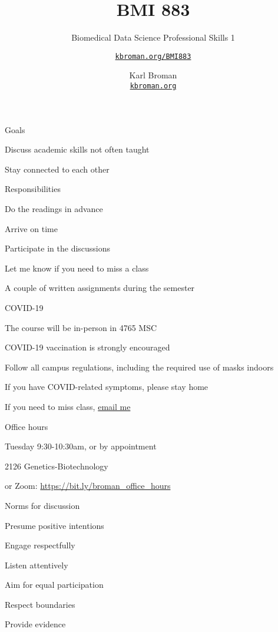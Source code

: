 \documentclass[aspectratio=169,12pt,t]{beamer}
\title{BMI 883}
\subtitle{Biomedical Data Science Professional Skills 1}
\author{\href{https://kbroman.org/BMI883}{\tt kbroman.org/BMI883} }
\institute{}
\date{\small \hspace{3in} Karl Broman \\
  \hspace{3in} \href{https://kbroman.org}{\color{foreground}
    \small \tt kbroman.org}}
\begin{document}
{
\frame{
  \titlepage
} }




\begin{frame}{Goals}

  \bbi
\item Discuss academic skills not often taught
\item Stay connected to each other
  \ei

\end{frame}




\begin{frame}{Responsibilities}

  \bbi
\item Do the readings in advance
\item Arrive on time
\item Participate in the discussions
\item Let me know if you need to miss a class
\item A couple of written assignments during the semester
  \ei

\end{frame}



\begin{frame}{COVID-19}

  \bbi
\item The course will be in-person in 4765 MSC
\item COVID-19 vaccination is strongly encouraged
\item Follow all campus regulations, including the required use of
  masks indoors
\item If you have COVID-related symptoms, please stay home
\item If you need to miss class, \href{mailto:broman@wisc.edu}{email me}
  \ei

\end{frame}




\begin{frame}{Office hours}

  \bbi
\item Tuesday 9:30-10:30am, {\hilit or by appointment}
\item 2126 Genetics-Biotechnology
\item or Zoom: \url{https://bit.ly/broman_office_hours}
\ei

\end{frame}






\begin{frame}{Norms for discussion}

      \bbi
    \item Presume positive intentions
    \item Engage respectfully
    \item Listen attentively
    \item Aim for equal participation
    \item Respect boundaries
    \item Provide evidence
      \ei

\end{frame}
\end{document}
